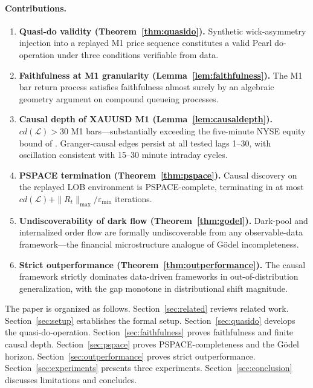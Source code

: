 \documentclass[12pt]{article}
\begin{document}
\paragraph{Contributions.}
\begin{enumerate}
\item \textbf{Quasi-do validity (Theorem~\ref{thm:quasido}).}
      Synthetic wick-asymmetry injection into a replayed M1 price
      sequence constitutes a valid Pearl do-operation under three
      conditions verifiable from data.

\item \textbf{Faithfulness at M1 granularity (Lemma~\ref{lem:faithfulness}).}
      The M1 bar return process satisfies faithfulness almost surely
      by an algebraic geometry argument on compound queueing processes.

\item \textbf{Causal depth of XAUUSD M1 (Lemma~\ref{lem:causaldepth}).}
      $cd(\mathcal{L}) > 30$ M1 bars---substantially exceeding
      the five-minute NYSE equity bound of \citet{hasbrouck1995}.
      Granger-causal edges persist at all tested lags 1--30,
      with oscillation consistent with 15--30 minute intraday cycles.

\item \textbf{PSPACE termination (Theorem~\ref{thm:pspace}).}
      Causal discovery on the replayed LOB environment is
      PSPACE-complete, terminating in at most
      $cd(\mathcal{L}) + \|R_t\|_{\max}/\varepsilon_{\min}$ iterations.

\item \textbf{Undiscoverability of dark flow (Theorem~\ref{thm:godel}).}
      Dark-pool and internalized order flow are formally undiscoverable
      from any observable-data framework---the financial microstructure
      analogue of G\"{o}del incompleteness.

\item \textbf{Strict outperformance (Theorem~\ref{thm:outperformance}).}
      The causal framework strictly dominates data-driven frameworks
      in out-of-distribution generalization, with the gap monotone
      in distributional shift magnitude.
\end{enumerate}

The paper is organized as follows.
Section~\ref{sec:related} reviews related work.
Section~\ref{sec:setup} establishes the formal setup.
Section~\ref{sec:quasido} develops the quasi-do-operation.
Section~\ref{sec:faithfulness} proves faithfulness and finite causal depth.
Section~\ref{sec:pspace} proves PSPACE-completeness and the
G\"{o}del horizon.
Section~\ref{sec:outperformance} proves strict outperformance.
Section~\ref{sec:experiments} presents three experiments.
Section~\ref{sec:conclusion} discusses limitations and concludes.
\end{document}
